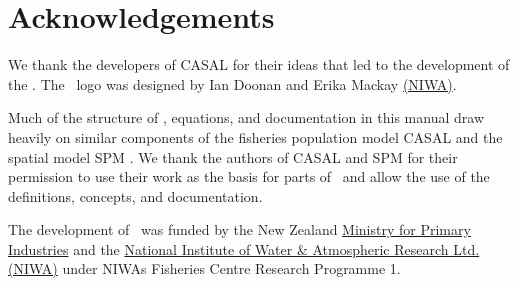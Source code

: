 \section{Acknowledgements\label{sec:acknowledgements}}

We thank the developers of CASAL \citep{1388} for their ideas that led to the development of the \CNAME. The \CNAME\ logo was designed by Ian Doonan and Erika Mackay \href{http://www.niwa.co.nz}{(NIWA)}.

Much of the structure of \CNAME, equations, and documentation in this manual draw heavily on similar components of the fisheries population model CASAL \citep{1388} and  the spatial model SPM \citep{SPM}. We thank the authors of CASAL and SPM for their permission to use their work as the basis for parts of \CNAME\ and allow the use of the definitions, concepts, and documentation. 

The development of \CNAME\ was funded by the New Zealand \href{http://www.mpi.govt.nz}{Ministry for Primary Industries} and the \href{http://www.niwa.co.nz}{National Institute of Water \& Atmospheric Research Ltd. (NIWA)} under NIWAs Fisheries Centre Research Programme 1. 
